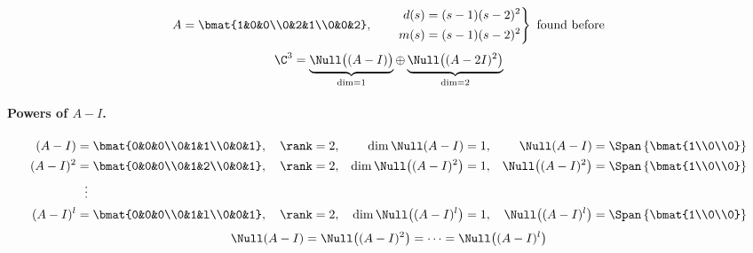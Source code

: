 \begin{example}
\[
A=\bmat{1&0&0\\0&2&1\\0&0&2},\qquad
\left.\begin{aligned}d(s)&=(s-1)(s-2)^2\\ m(s)&=(s-1)(s-2)^2\end{aligned}\right\}\ \text{found before}
\]
\[
\C^3=\underbrace{\Null\big((A-I)\big)}_{\dim=1}\oplus\underbrace{\Null\big((A-2I)^2\big)}_{\dim=2}
\]
\paragraph{Powers of $A-I$.}
\begin{align*}
(A-I)&=\bmat{0&0&0\\0&1&1\\0&0&1}, \quad \rank=2, & \dim\Null(A-I)&=1, & \Null(A-I)&=\Span\left\{\bmat{1\\0\\0}\right\}\\
(A-I)^2&=\bmat{0&0&0\\0&1&2\\0&0&1}, \quad \rank=2, & \dim\Null\big((A-I)^2\big)&=1, & \Null\big((A-I)^2\big)&=\Span\left\{\bmat{1\\0\\0}\right\}\\
&\ \ \vdots\\
(A-I)^l&=\bmat{0&0&0\\0&1&l\\0&0&1}, \quad \rank=2, & \dim\Null\big((A-I)^l\big)&=1, & \Null\big((A-I)^l\big)&=\Span\left\{\bmat{1\\0\\0}\right\}
\end{align*}
\[
\Null(A-I)=\Null\big((A-I)^2\big)=\dots=\Null\big((A-I)^l\big)
\]


\end{example}
